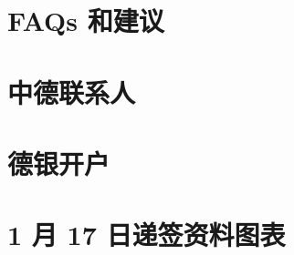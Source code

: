 \documentclass[oneside,final]{book}
\begin{document}
\chapter{FAQs 和建议}\label{chap:faq}


\begin{appendices}
\chapter{中德联系人}


\newpage

\chapter{德银开户}\label{ap:bank}


\chapter{1 月 17 日递签资料图表}\label{ap:visa-figures}


\end{appendices}

\listoftables
\listoffigures
\end{document}
